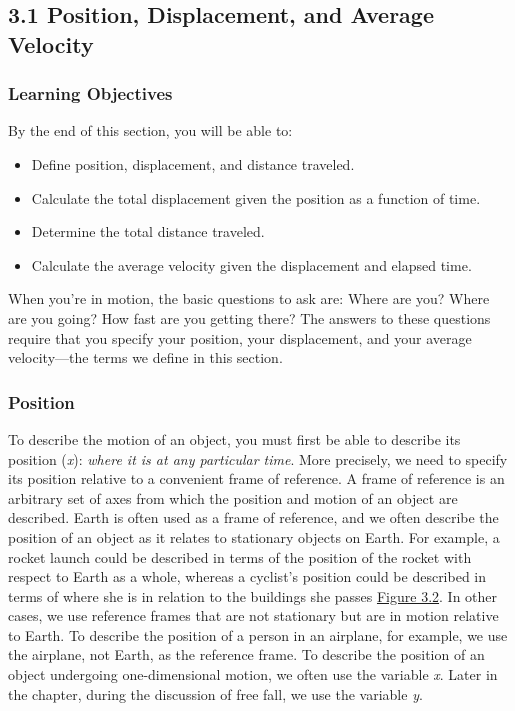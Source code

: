 \hypertarget{position-displacement-and-average-velocity}{%
\subsection{3.1 Position, Displacement, and Average
Velocity}\label{position-displacement-and-average-velocity}}

\hypertarget{learning-objectives}{%
\subsubsection{Learning Objectives}\label{learning-objectives}}

By the end of this section, you will be able to:

\begin{itemize}
\item
  Define position, displacement, and distance traveled.
\item
  Calculate the total displacement given the position as a function of
  time.
\item
  Determine the total distance traveled.
\item
  Calculate the average velocity given the displacement and elapsed
  time.
\end{itemize}

When you're in motion, the basic questions to ask are: Where are you?
Where are you going? How fast are you getting there? The answers to
these questions require that you specify your position, your
displacement, and your average velocity---the terms we define in this
section.

\hypertarget{position}{%
\subsubsection{Position}\label{position}}

To describe the motion of an object, you must first be able to describe
its position (\emph{x}): \emph{where it is at any particular time}. More
precisely, we need to specify its position relative to a convenient
frame of reference. A frame of reference is an arbitrary set of axes
from which the position and motion of an object are described. Earth is
often used as a frame of reference, and we often describe the position
of an object as it relates to stationary objects on Earth. For example,
a rocket launch could be described in terms of the position of the
rocket with respect to Earth as a whole, whereas a cyclist's position
could be described in terms of where she is in relation to the buildings
she passes \protect\hyperlink{CNX_UPhysics_03_01_Cyclists}{Figure 3.2}.
In other cases, we use reference frames that are not stationary but are
in motion relative to Earth. To describe the position of a person in an
airplane, for example, we use the airplane, not Earth, as the reference
frame. To describe the position of an object undergoing one-dimensional
motion, we often use the variable \emph{x}. Later in the chapter, during
the discussion of free fall, we use the variable \emph{y}.

